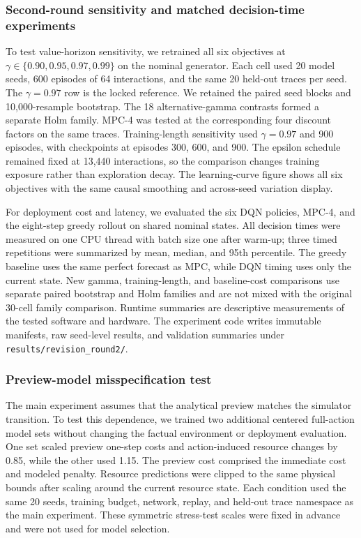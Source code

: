 \documentclass[remotesensing,article,submit,moreauthors]{Definitions/mdpi}
\newenvironment{revisedblock}{\color{red}}{}
\newenvironment{revisedblock}{}{}
\begin{document}
\begin{revisedblock}
\subsubsection{Second-round sensitivity and matched decision-time experiments}
\label{sec:revision_experiments}

To test value-horizon sensitivity, we retrained all six objectives at $\gamma\in\{0.90,0.95,0.97,0.99\}$ on the nominal generator. Each cell used 20 model seeds, 600 episodes of 64 interactions, and the same 20 held-out traces per seed. The $\gamma=0.97$ row is the locked reference. We retained the paired seed blocks and 10,000-resample bootstrap. The 18 alternative-gamma contrasts formed a separate Holm family. MPC-4 was tested at the corresponding four discount factors on the same traces. Training-length sensitivity used $\gamma=0.97$ and 900 episodes, with checkpoints at episodes 300, 600, and 900. The epsilon schedule remained fixed at 13,440 interactions, so the comparison changes training exposure rather than exploration decay. The learning-curve figure shows all six objectives with the same causal smoothing and across-seed variation display.

For deployment cost and latency, we evaluated the six DQN policies, MPC-4, and the eight-step greedy rollout on shared nominal states. All decision times were measured on one CPU thread with batch size one after warm-up; three timed repetitions were summarized by mean, median, and 95th percentile. The greedy baseline uses the same perfect forecast as MPC, while DQN timing uses only the current state. New gamma, training-length, and baseline-cost comparisons use separate paired bootstrap and Holm families and are not mixed with the original 30-cell family comparison. Runtime summaries are descriptive measurements of the tested software and hardware. The experiment code writes immutable manifests, raw seed-level results, and validation summaries under \texttt{results/revision\_round2/}.
\end{revisedblock}

\subsubsection{Preview-model misspecification test}

The main experiment assumes that the analytical preview matches the simulator transition. To test this dependence, we trained two additional centered full-action model sets without changing the factual environment or deployment evaluation. One set scaled preview one-step costs and action-induced resource changes by 0.85, while the other used 1.15. The preview cost comprised the immediate cost and modeled penalty. Resource predictions were clipped to the same physical bounds after scaling around the current resource state. Each condition used the same 20 seeds, training budget, network, replay, and held-out trace namespace as the main experiment. These symmetric stress-test scales were fixed in advance and were not used for model selection.
\end{document}
